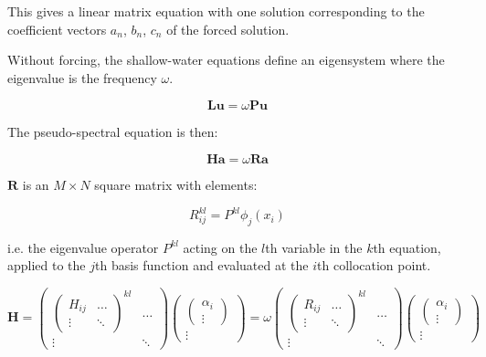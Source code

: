 This gives a linear matrix equation with one solution corresponding to the coefficient vectors $a_{n}$, $b_{n}$, $c_{n}$ of the forced solution.

Without forcing, the shallow-water equations define an eigensystem where the eigenvalue is the frequency $\omega$.

\begin{equation}
  \textbf{L} \textbf{u} = \omega \textbf{P} \textbf{u}
\end{equation}

The pseudo-spectral equation is then:

\begin{equation}
  \textbf{H} \textbf{a} = \omega \textbf{R} \textbf{a}
\end{equation}

 $\textbf{R}$ is an $M \times N$ square matrix with elements:

\begin{equation}
  R^{kl}_{ij} = P^{kl}\phi_{j}(x_{i})
\end{equation}

i.e. the eigenvalue operator $P^{kl}$ acting on the $l$th variable in the $k$th equation, applied to the $j$th basis function and evaluated at the $i$th collocation point.

\begin{equation}
    \textbf{H} =
  \begin{pmatrix}
    \begin{pmatrix}
H_{ij} & \dots \\
\vdots & \ddots
    \end{pmatrix}^{kl} & \dots \\
  \vdots & \ddots
  \end{pmatrix}
  \begin{pmatrix}
    \begin{pmatrix}
    \alpha_{i} \\
    \vdots
    \end{pmatrix} \\
  \vdots
  \end{pmatrix}
  =
  \omega
  \begin{pmatrix}
    \begin{pmatrix}
R_{ij} & \dots \\
\vdots & \ddots
    \end{pmatrix}^{kl} & \dots \\
  \vdots & \ddots
  \end{pmatrix}
  \begin{pmatrix}
    \begin{pmatrix}
    \alpha_{i} \\
    \vdots
    \end{pmatrix} \\
  \vdots
  \end{pmatrix}
\end{equation}


